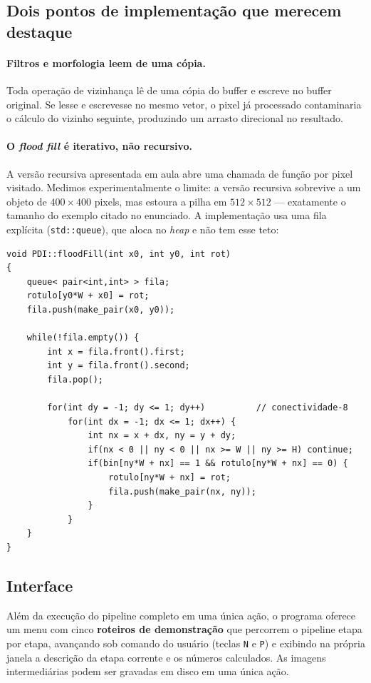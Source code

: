 \documentclass[12pt,a4paper]{article}
\begin{document}
\subsection{Dois pontos de implementação que merecem destaque}

\paragraph{Filtros e morfologia leem de uma cópia.} Toda operação de
vizinhança lê de uma cópia do buffer e escreve no buffer original. Se lesse e
escrevesse no mesmo vetor, o pixel já processado contaminaria o cálculo do
vizinho seguinte, produzindo um arrasto direcional no resultado.

\paragraph{O \emph{flood fill} é iterativo, não recursivo.} A versão recursiva
apresentada em aula abre uma chamada de função por pixel visitado. Medimos
experimentalmente o limite: a versão recursiva sobrevive a um objeto de
$400\times400$ pixels, mas estoura a pilha em $512\times512$ --- exatamente o
tamanho do exemplo citado no enunciado. A implementação usa uma fila explícita
(\texttt{std::queue}), que aloca no \emph{heap} e não tem esse teto:

\begin{lstlisting}
void PDI::floodFill(int x0, int y0, int rot)
{
    queue< pair<int,int> > fila;
    rotulo[y0*W + x0] = rot;
    fila.push(make_pair(x0, y0));

    while(!fila.empty()) {
        int x = fila.front().first;
        int y = fila.front().second;
        fila.pop();

        for(int dy = -1; dy <= 1; dy++)          // conectividade-8
            for(int dx = -1; dx <= 1; dx++) {
                int nx = x + dx, ny = y + dy;
                if(nx < 0 || ny < 0 || nx >= W || ny >= H) continue;
                if(bin[ny*W + nx] == 1 && rotulo[ny*W + nx] == 0) {
                    rotulo[ny*W + nx] = rot;
                    fila.push(make_pair(nx, ny));
                }
            }
    }
}
\end{lstlisting}

\subsection{Interface}

Além da execução do pipeline completo em uma única ação, o programa oferece um
menu com cinco \textbf{roteiros de demonstração} que percorrem o pipeline
etapa por etapa, avançando sob comando do usuário (teclas \texttt{N} e
\texttt{P}) e exibindo na própria janela a descrição da etapa corrente e os
números calculados. As imagens intermediárias podem ser gravadas em disco em
uma única ação.
\end{document}
